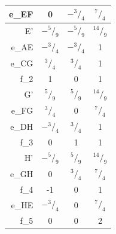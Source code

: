 \documentclass{article}
\newcommand*\rfrac[2]{{}^{#1}\!/_{#2}}%
\begin{document}
\begin{center}
\begin{table}[!h]
\begin{minipage}{.5\linewidth}
\begin{tabular}{ | r | c | c | c | }
    e_{EF} & 0 & $ -\rfrac{3}{4} $ & $ \rfrac{7}{4} $ \\ \hline    
    E' & $ -\rfrac{5}{9} $ & $ -\rfrac{5}{9} $ & $ \rfrac{14}{9} $ \\ \hline
    e_{AE} & $ -\rfrac{3}{4} $ & $ -\rfrac{3}{4} $ & 1 \\ \hline    
    e_{CG} & $ \rfrac{3}{4} $ & $ \rfrac{3}{4} $ & 1 \\ \hline
    f_2 & 1 & 0 & 1 \\ \hline
    G' & $ \rfrac{5}{9} $ & $ \rfrac{5}{9} $ & $ \rfrac{14}{9} $ \\ \hline
    e_{FG} & $ \rfrac{3}{4} $ & 0 & $ \rfrac{7}{4} $ \\ \hline
    e_{DH} & $ -\rfrac{3}{4} $ & $ \rfrac{3}{4} $ & 1 \\ \hline    
    f_3 & 0 & 1 & 1 \\ \hline    
    H' & $ -\rfrac{5}{9} $ & $ \rfrac{5}{9} $ & $ \rfrac{14}{9} $ \\ \hline
    e_{GH} & 0 & $ \rfrac{3}{4} $ & $ \rfrac{7}{4} $ \\ \hline
    f_4 & -1 & 0 & 1 \\ \hline    
    e_{HE} & $ -\rfrac{3}{4} $ & 0 & $ \rfrac{7}{4} $ \\ \hline
    f_5 & 0 & 0 & 2 \\ \hline
    \hline
  \end{tabular}
    \end{minipage} 
\end{table}
\end{center}
\renewcommand{\arraystretch}{1}


\end{document}

